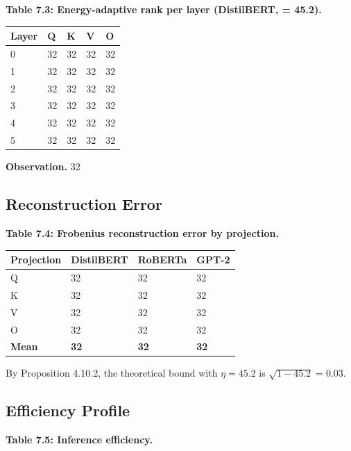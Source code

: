 \textbf{Table 7.3: Energy-adaptive rank per layer (DistilBERT,   = 45.2).}

\begin{table}[H]
\centering
\small
\begin{tabular}{lllll}
\toprule
\textbf{Layer} & \textbf{Q} & \textbf{K} & \textbf{V} & \textbf{O} \\
\midrule
0 & 32 & 32 & 32 & 32 \\
1 & 32 & 32 & 32 & 32 \\
2 & 32 & 32 & 32 & 32 \\
3 & 32 & 32 & 32 & 32 \\
4 & 32 & 32 & 32 & 32 \\
5 & 32 & 32 & 32 & 32 \\
\bottomrule
\end{tabular}
\end{table}

\textbf{Observation.} 32

\subsection{Reconstruction Error}

\textbf{Table 7.4: Frobenius reconstruction error by projection.}

\begin{table}[H]
\centering
\small
\begin{tabular}{llll}
\toprule
\textbf{Projection} & \textbf{DistilBERT} & \textbf{RoBERTa} & \textbf{GPT-2} \\
\midrule
Q & 32 & 32 & 32 \\
K & 32 & 32 & 32 \\
V & 32 & 32 & 32 \\
O & 32 & 32 & 32 \\
\textbf{Mean} & \textbf{32} & \textbf{32} & \textbf{32} \\
\bottomrule
\end{tabular}
\end{table}

By Proposition 4.10.2, the theoretical bound with $\eta = 45.2$ is 
$\sqrt{1 - 45.2} = 0.03$.

\subsection{Efficiency Profile}

\textbf{Table 7.5: Inference efficiency.}

